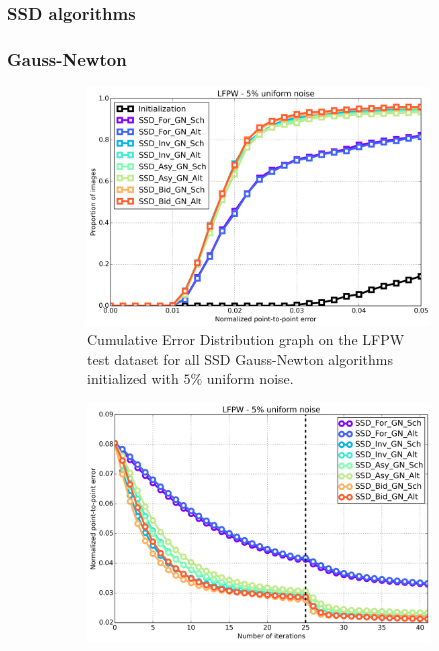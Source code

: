 \subsubsection{SSD algorithms}


\subsubsection*{Gauss-Newton}

\begin{figure}[h!]
	\centering
	\begin{subfigure}{0.48\textwidth}
	    \includegraphics[width=\textwidth]{experiments/algorithms/ssd_gn/ced_ssd_gn_5.png}
	    \caption{Cumulative Error Distribution graph on the LFPW test dataset for all SSD Gauss-Newton algorithms initialized with $5\%$ uniform noise.}
	    \label{fig:ced_ssd_gn_5}
	\end{subfigure}
	\hfill
	\begin{subfigure}{0.48\textwidth}
	    \includegraphics[width=\textwidth]{experiments/algorithms/ssd_gn/mean_error_vs_iters_ssd_gn_5.png}

\end{subfigure}
\end{figure}
